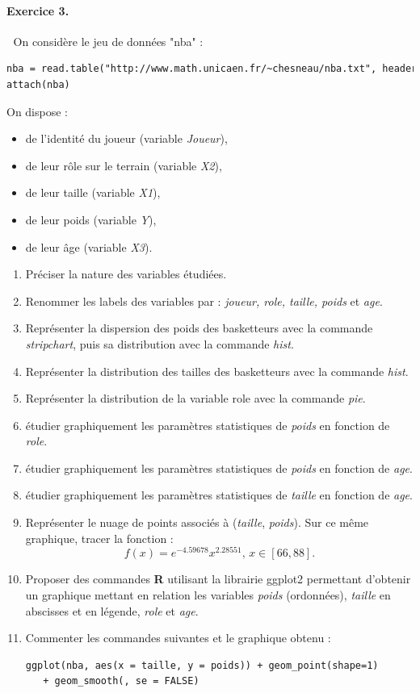 \paragraph{Exercice 3. }\textcolor{white}{.}\newline
On considère le jeu de données "nba" :
\begin{lstlisting}[language=html]
nba = read.table("http://www.math.unicaen.fr/~chesneau/nba.txt", header = T, sep = ",")
attach(nba)
\end{lstlisting}
On dispose :
\begin{itemize}
\item de l'identité du joueur (variable \textit{Joueur}),
\item de leur rôle sur le terrain (variable \textit{X2}),
\item de leur taille (variable \textit{X1}),
\item de leur poids (variable \textit{Y}),
\item de leur âge (variable \textit{X3}).
\end{itemize}
\begin{enumerate}
\item Préciser la nature des variables étudiées.
\item Renommer les labels des variables par : \textit{joueur, role, taille, poids} et \textit{age}.
\item Représenter la dispersion des poids des basketteurs avec la commande \textit{stripchart}, puis sa distribution avec la commande \textit{hist}.
\item Représenter la distribution des tailles des basketteurs avec la commande \textit{hist}.
\item Représenter la distribution de la variable role avec la commande \textit{pie}.
\item étudier graphiquement les paramètres statistiques de \textit{poids} en fonction de \textit{role}.
\item étudier graphiquement les paramètres statistiques de \textit{poids} en fonction de \textit{age}.
\item étudier graphiquement les paramètres statistiques de \textit{taille} en fonction de \textit{age}.
\item Représenter le nuage de points associés à (\textit{taille}, \textit{poids}). Sur ce même graphique, tracer la fonction :
$$f(x) = e^{-4.59678}x^{2.28551}\textrm{, } x \in [66,88].$$
\item Proposer des commandes \textbf{R} utilisant la librairie ggplot2 permettant d'obtenir un graphique mettant en relation les variables \textit{poids} (ordonnées), \textit{taille} en abscisses et en légende, \textit{role} et \textit{age}.
\item Commenter les commandes suivantes et le graphique obtenu :
\begin{lstlisting}[language=html]
ggplot(nba, aes(x = taille, y = poids)) + geom_point(shape=1)
   + geom_smooth(, se = FALSE)
\end{lstlisting}
\end{enumerate}
